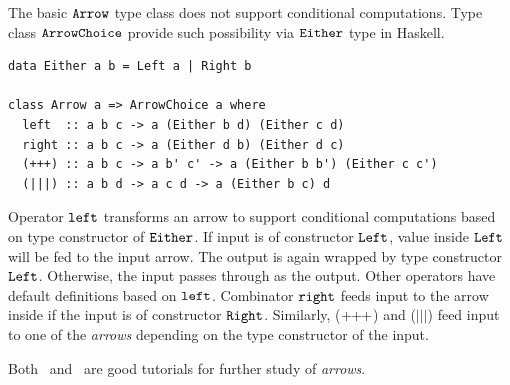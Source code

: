 \documentclass[a4paper]{report}
\newcommand{\arrowop}[1]{$#1\negthickspace #1\negthickspace #1$}
\newcommand{\co}[1]{$\cod{#1}$}
\begin{document}
The basic $\mathtt{Arrow}$ type class does not support conditional computations. Type class
$\mathtt{ArrowChoice}$ provide such possibility via $\mathtt{Either}$ type in Haskell.
\begin{Verbatim}[fontsize=\footnotesize]
data Either a b = Left a | Right b

class Arrow a => ArrowChoice a where
  left  :: a b c -> a (Either b d) (Either c d)
  right :: a b c -> a (Either d b) (Either d c)
  (+++) :: a b c -> a b' c' -> a (Either b b') (Either c c')
  (|||) :: a b d -> a c d -> a (Either b c) d
\end{Verbatim}
Operator $\mathtt{left}$ transforms an arrow to support conditional computations based on 
type constructor of $\mathtt{Either}$. If input is of constructor $\mathtt{Left}$, value inside 
$\mathtt{Left}$ will be fed to the input arrow. 
The output is again wrapped by type constructor \co{Left}.
Otherwise, the input passes through as the output.
Other operators have default definitions based on $\mathtt{left}$. 
Combinator $\mathtt{right}$ feeds input to the arrow inside if the input is
of constructor $\mathtt{Right}$. Similarly, (\arrowop{+}) and ($|||$) feed input to one of the
{\em arrows} depending on the type constructor of the input.



Both~\cite{Hughes:ISSAFP05} and~\cite{Paterson:TFP03} are good tutorials for further 
study of {\em arrows}.
\end{document}
